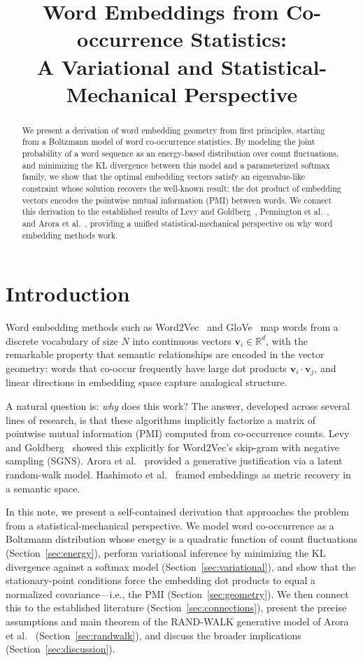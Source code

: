\documentclass[11pt]{article}
\title{Word Embeddings from Co-occurrence Statistics:\\A Variational and Statistical-Mechanical Perspective}
\author{}
\date{}
\newcommand{\vw}{\bm{v}}
\begin{document}
\maketitle

\begin{abstract}
We present a derivation of word embedding geometry from first principles, starting from a Boltzmann model of word co-occurrence statistics. By modeling the joint probability of a word sequence as an energy-based distribution over count fluctuations, and minimizing the KL divergence between this model and a parameterized softmax family, we show that the optimal embedding vectors satisfy an eigenvalue-like constraint whose solution recovers the well-known result: the dot product of embedding vectors encodes the pointwise mutual information (PMI) between words. We connect this derivation to the established results of Levy and Goldberg~\cite{levy2014}, Pennington et al.~\cite{pennington2014}, and Arora et al.~\cite{arora2016}, providing a unified statistical-mechanical perspective on why word embedding methods work.
\end{abstract}

\section{Introduction}\label{sec:intro}

Word embedding methods such as Word2Vec~\cite{mikolov2013} and GloVe~\cite{pennington2014} map words from a discrete vocabulary of size $N$ into continuous vectors $\vw_i \in \mathbb{R}^d$, with the remarkable property that semantic relationships are encoded in the vector geometry: words that co-occur frequently have large dot products $\vw_i \cdot \vw_j$, and linear directions in embedding space capture analogical structure.

A natural question is: \emph{why} does this work? The answer, developed across several lines of research, is that these algorithms implicitly factorize a matrix of pointwise mutual information (PMI) computed from co-occurrence counts. Levy and Goldberg~\cite{levy2014} showed this explicitly for Word2Vec's skip-gram with negative sampling (SGNS). Arora et al.~\cite{arora2016} provided a generative justification via a latent random-walk model. Hashimoto et al.~\cite{hashimoto2016} framed embeddings as metric recovery in a semantic space.

In this note, we present a self-contained derivation that approaches the problem from a statistical-mechanical perspective. We model word co-occurrence as a Boltzmann distribution whose energy is a quadratic function of count fluctuations (Section~\ref{sec:energy}), perform variational inference by minimizing the KL divergence against a softmax model (Section~\ref{sec:variational}), and show that the stationary-point conditions force the embedding dot products to equal a normalized covariance---i.e., the PMI (Section~\ref{sec:geometry}). We then connect this to the established literature (Section~\ref{sec:connections}), present the precise assumptions and main theorem of the RAND-WALK generative model of Arora et al.~\cite{arora2016} (Section~\ref{sec:randwalk}), and discuss the broader implications (Section~\ref{sec:discussion}).
\end{document}
